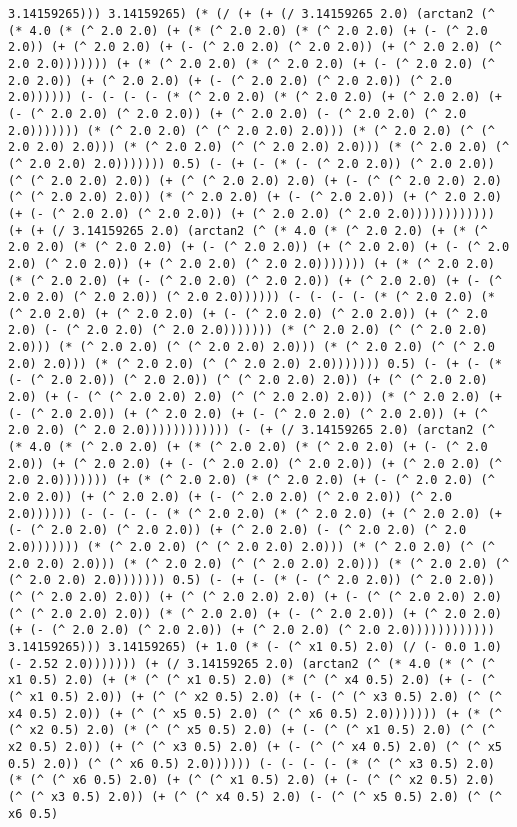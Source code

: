 \begin{lstlisting}
3.14159265))) 3.14159265) (* (/ (+ (+ (/ 3.14159265 2.0) (arctan2 (^ (* 4.0 (* (^ 2.0 2.0) (+ (* (^ 2.0 2.0) (* (^ 2.0 2.0) (+ (- (^ 2.0 2.0)) (+ (^ 2.0 2.0) (+ (- (^ 2.0 2.0) (^ 2.0 2.0)) (+ (^ 2.0 2.0) (^ 2.0 2.0))))))) (+ (* (^ 2.0 2.0) (* (^ 2.0 2.0) (+ (- (^ 2.0 2.0) (^ 2.0 2.0)) (+ (^ 2.0 2.0) (+ (- (^ 2.0 2.0) (^ 2.0 2.0)) (^ 2.0 2.0)))))) (- (- (- (- (* (^ 2.0 2.0) (* (^ 2.0 2.0) (+ (^ 2.0 2.0) (+ (- (^ 2.0 2.0) (^ 2.0 2.0)) (+ (^ 2.0 2.0) (- (^ 2.0 2.0) (^ 2.0 2.0))))))) (* (^ 2.0 2.0) (^ (^ 2.0 2.0) 2.0))) (* (^ 2.0 2.0) (^ (^ 2.0 2.0) 2.0))) (* (^ 2.0 2.0) (^ (^ 2.0 2.0) 2.0))) (* (^ 2.0 2.0) (^ (^ 2.0 2.0) 2.0))))))) 0.5) (- (+ (- (* (- (^ 2.0 2.0)) (^ 2.0 2.0)) (^ (^ 2.0 2.0) 2.0)) (+ (^ (^ 2.0 2.0) 2.0) (+ (- (^ (^ 2.0 2.0) 2.0) (^ (^ 2.0 2.0) 2.0)) (* (^ 2.0 2.0) (+ (- (^ 2.0 2.0)) (+ (^ 2.0 2.0) (+ (- (^ 2.0 2.0) (^ 2.0 2.0)) (+ (^ 2.0 2.0) (^ 2.0 2.0)))))))))))) (+ (+ (/ 3.14159265 2.0) (arctan2 (^ (* 4.0 (* (^ 2.0 2.0) (+ (* (^ 2.0 2.0) (* (^ 2.0 2.0) (+ (- (^ 2.0 2.0)) (+ (^ 2.0 2.0) (+ (- (^ 2.0 2.0) (^ 2.0 2.0)) (+ (^ 2.0 2.0) (^ 2.0 2.0))))))) (+ (* (^ 2.0 2.0) (* (^ 2.0 2.0) (+ (- (^ 2.0 2.0) (^ 2.0 2.0)) (+ (^ 2.0 2.0) (+ (- (^ 2.0 2.0) (^ 2.0 2.0)) (^ 2.0 2.0)))))) (- (- (- (- (* (^ 2.0 2.0) (* (^ 2.0 2.0) (+ (^ 2.0 2.0) (+ (- (^ 2.0 2.0) (^ 2.0 2.0)) (+ (^ 2.0 2.0) (- (^ 2.0 2.0) (^ 2.0 2.0))))))) (* (^ 2.0 2.0) (^ (^ 2.0 2.0) 2.0))) (* (^ 2.0 2.0) (^ (^ 2.0 2.0) 2.0))) (* (^ 2.0 2.0) (^ (^ 2.0 2.0) 2.0))) (* (^ 2.0 2.0) (^ (^ 2.0 2.0) 2.0))))))) 0.5) (- (+ (- (* (- (^ 2.0 2.0)) (^ 2.0 2.0)) (^ (^ 2.0 2.0) 2.0)) (+ (^ (^ 2.0 2.0) 2.0) (+ (- (^ (^ 2.0 2.0) 2.0) (^ (^ 2.0 2.0) 2.0)) (* (^ 2.0 2.0) (+ (- (^ 2.0 2.0)) (+ (^ 2.0 2.0) (+ (- (^ 2.0 2.0) (^ 2.0 2.0)) (+ (^ 2.0 2.0) (^ 2.0 2.0)))))))))))) (- (+ (/ 3.14159265 2.0) (arctan2 (^ (* 4.0 (* (^ 2.0 2.0) (+ (* (^ 2.0 2.0) (* (^ 2.0 2.0) (+ (- (^ 2.0 2.0)) (+ (^ 2.0 2.0) (+ (- (^ 2.0 2.0) (^ 2.0 2.0)) (+ (^ 2.0 2.0) (^ 2.0 2.0))))))) (+ (* (^ 2.0 2.0) (* (^ 2.0 2.0) (+ (- (^ 2.0 2.0) (^ 2.0 2.0)) (+ (^ 2.0 2.0) (+ (- (^ 2.0 2.0) (^ 2.0 2.0)) (^ 2.0 2.0)))))) (- (- (- (- (* (^ 2.0 2.0) (* (^ 2.0 2.0) (+ (^ 2.0 2.0) (+ (- (^ 2.0 2.0) (^ 2.0 2.0)) (+ (^ 2.0 2.0) (- (^ 2.0 2.0) (^ 2.0 2.0))))))) (* (^ 2.0 2.0) (^ (^ 2.0 2.0) 2.0))) (* (^ 2.0 2.0) (^ (^ 2.0 2.0) 2.0))) (* (^ 2.0 2.0) (^ (^ 2.0 2.0) 2.0))) (* (^ 2.0 2.0) (^ (^ 2.0 2.0) 2.0))))))) 0.5) (- (+ (- (* (- (^ 2.0 2.0)) (^ 2.0 2.0)) (^ (^ 2.0 2.0) 2.0)) (+ (^ (^ 2.0 2.0) 2.0) (+ (- (^ (^ 2.0 2.0) 2.0) (^ (^ 2.0 2.0) 2.0)) (* (^ 2.0 2.0) (+ (- (^ 2.0 2.0)) (+ (^ 2.0 2.0) (+ (- (^ 2.0 2.0) (^ 2.0 2.0)) (+ (^ 2.0 2.0) (^ 2.0 2.0)))))))))))) 3.14159265))) 3.14159265) (+ 1.0 (* (- (^ x1 0.5) 2.0) (/ (- 0.0 1.0) (- 2.52 2.0))))))) (+ (/ 3.14159265 2.0) (arctan2 (^ (* 4.0 (* (^ (^ x1 0.5) 2.0) (+ (* (^ (^ x1 0.5) 2.0) (* (^ (^ x4 0.5) 2.0) (+ (- (^ (^ x1 0.5) 2.0)) (+ (^ (^ x2 0.5) 2.0) (+ (- (^ (^ x3 0.5) 2.0) (^ (^ x4 0.5) 2.0)) (+ (^ (^ x5 0.5) 2.0) (^ (^ x6 0.5) 2.0))))))) (+ (* (^ (^ x2 0.5) 2.0) (* (^ (^ x5 0.5) 2.0) (+ (- (^ (^ x1 0.5) 2.0) (^ (^ x2 0.5) 2.0)) (+ (^ (^ x3 0.5) 2.0) (+ (- (^ (^ x4 0.5) 2.0) (^ (^ x5 0.5) 2.0)) (^ (^ x6 0.5) 2.0)))))) (- (- (- (- (* (^ (^ x3 0.5) 2.0) (* (^ (^ x6 0.5) 2.0) (+ (^ (^ x1 0.5) 2.0) (+ (- (^ (^ x2 0.5) 2.0) (^ (^ x3 0.5) 2.0)) (+ (^ (^ x4 0.5) 2.0) (- (^ (^ x5 0.5) 2.0) (^ (^ x6 0.5) 
\end{lstlisting}
